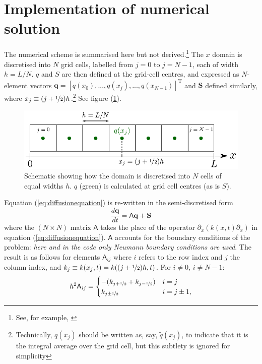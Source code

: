 \documentclass[12pt]{article}
\begin{document}
\section{Implementation of numerical solution}
The numerical scheme is summarised here but not derived.\footnote{See, for example, \color{blue}\underline{\href{http://www.csc.kth.se/utbildning/kth/kurser/DN2255/ndiff13/Lecture3.pdf}{}}\color{black}} The $x$ domain is discretised into $N$ grid cells, labelled from $j=0$ to $j=N-1$, each of width $h = L/N$. $q$ and $S$ are then defined at the grid-cell centres, and expressed as $N$-element vectors $\mathbf{q}=[q(x_0),...,q(x_j),...,q(x_{N-1})]^\mathrm{T}$ and $\mathbf{S}$ defined similarly, where $x_j\equiv(j+\nicefrac{1}{2})h$.\footnote{Technically, $q(x_j)$ should be written as, say, $\tilde{q}(x_j)$, to indicate that it is the integral average over the grid cell, but this subtlety is ignored for simplicity} See figure (\ref{fig:gridschematic}).
\begin{figure}[h]
\centering
\includegraphics[width=0.8\linewidth]{grid_schematic.pdf}
\caption{Schematic showing how the domain is discretised into $N$ cells of equal widths $h$. $q$ (green) is calculated at grid cell centres (as is $S$).}
\label{fig:gridschematic}
\end{figure}

\noindent
Equation (\ref{eq:diffusionequation}) is re-written in the semi-discretised form
\begin{equation}\label{eq:semidiscrete}
\frac{d\mathbf{q}}{dt} = \mathsf{A}\mathbf{q} + \mathbf{S}
\end{equation}
where the $(N\times N)$ matrix $\mathsf{A}$ takes the place of the operator $\partial_x(k(x,t)\partial_x)$ in equation (\ref{eq:diffusionequation}). $\mathsf{A}$ accounts for the boundary conditions of the problem: \textit{here and in the code only Neumann boundary conditions are used}. The result is as follows for elements $\mathsf{A}_{ij}$ where $i$ refers to the row index and $j$ the column index, and $k_j\equiv k(x_j,t)=k((j+\nicefrac{1}{2})h,t)$. For $i\neq 0$, $i\neq N-1$:
\begin{equation}\label{eq:matrixelements}
h^2\mathsf{A}_{ij} = \begin{cases}
    -(k_{j+\nicefrac{1}{2}}+k_{j-\nicefrac{1}{2}}) & i=j \\
    k_{j\pm\nicefrac{1}{2}} & i=j\pm1, \\
    \end{cases}
\end{equation}
\end{document}
